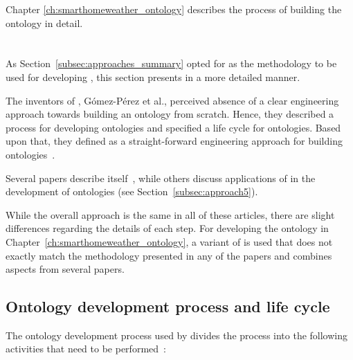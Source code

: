 Chapter \ref{ch:smarthomeweather_ontology} describes the process of building the \smarthomeweather ontology in detail.

\section{\methontology}
\label{sec:methontology}

As Section~\ref{subsec:approaches_summary} opted for \methontology as the methodology to be used for developing \smarthomeweather, this section presents \methontology in a more detailed manner.

\vspace{1em}

The inventors of \methontology, Gómez-Pérez et al., perceived absence of a clear engineering approach towards building an ontology from scratch. Hence, they described a process for developing ontologies and specified a life cycle for ontologies. Based upon that, they defined \methontology as a straight-forward engineering approach for building ontologies~\cite{Methontology}.

Several papers describe \methontology itself~\cite{Methontology,Methontology2,ORSD}, while others discuss applications of \methontology in the development of ontologies (see Section~\ref{subsec:approach5}).

While the overall approach is the same in all of these articles, there are slight differences regarding the details of each step. For developing the \smarthomeweather ontology in Chapter~\ref{ch:smarthomeweather_ontology}, a variant of \methontology is used that does not exactly match the methodology presented in any of the papers and combines aspects from several papers.

\subsection{Ontology development process and life cycle}

The ontology development process used by \methontology divides the process into the following activities that need to be performed~\cite{Methontology}:

